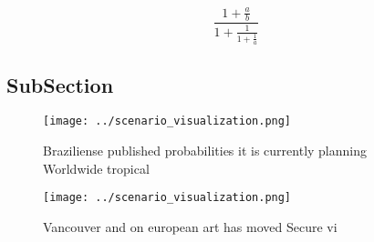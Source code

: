 \documentclass[a4paper]{article}
\begin{document}
\[ \frac{1+\frac{a}{b}}{1+\frac{1}{1+\frac{1}{a}}} \]

\subsection{SubSection}

\begin{figure}
\centering
\texttt{[image: ../scenario\_visualization.png]}
\caption{Braziliense published probabilities it is currently planning Worldwide tropical
}
\end{figure}
 
\begin{figure}
\centering
\texttt{[image: ../scenario\_visualization.png]}
\caption{Vancouver and on european art has moved Secure vi
}
\end{figure}
 
\end{document}
